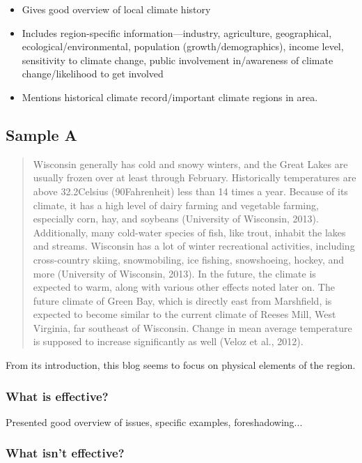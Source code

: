 \documentclass{article}\usepackage[]{graphicx}\usepackage[]{color}
\begin{document}
\begin{itemize}
  \item Gives good overview of local climate history
  \item Includes region-specific information—industry, agriculture, geographical, ecological/environmental, population (growth/demographics), income level, sensitivity to climate change, public involvement in/awareness of climate change/likelihood to get involved
  \item Mentions historical climate record/important climate regions in area.
\end{itemize}

\subsection{Sample A}

\begin{quote}
Wisconsin generally has cold and snowy winters, and the Great Lakes are usually frozen over at least through February. Historically temperatures are above 32.2\degree Celsius (90\degree Fahrenheit) less than 14 times a year. Because of its climate, it has a high level of dairy farming and vegetable farming, especially corn, hay, and soybeans (University of Wisconsin, 2013). Additionally, many cold-water species of fish, like trout, inhabit the lakes and streams. Wisconsin has a lot of winter recreational activities, including cross-country skiing, snowmobiling, ice fishing, snowshoeing, hockey, and more (University of Wisconsin, 2013). In the future, the climate is expected to warm, along with various other effects noted later on. The future climate of Green Bay, which is directly east from Marshfield, is expected to become similar to the current climate of Reeses Mill, West Virginia, far southeast of Wisconsin. Change in mean average temperature is supposed to increase significantly as well (Veloz et al., 2012). 
\end{quote}

From its introduction, this blog seems to focus on physical elements of the region.

\subsubsection{What is effective?}

Presented good overview of issues, specific examples, foreshadowing...

\subsubsection{What isn't effective?}
\end{document}
